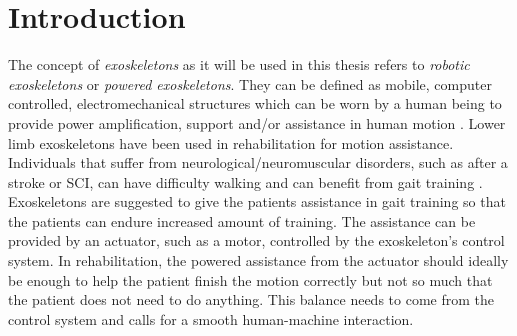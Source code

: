 \documentclass[../main.tex]{subfiles}
\begin{document}
\chapter{Introduction}
The concept of \textit{exoskeletons} as it will be used in this thesis refers to \textit{robotic exoskeletons} or \textit{powered exoskeletons}. 
They can be defined as mobile, computer controlled, electromechanical structures which can be worn by a human being to provide power amplification, support and/or assistance in human motion \cite{Anam2012, Gorgey2018}. 
Lower limb exoskeletons have been used in rehabilitation for motion assistance.
Individuals that suffer from neurological/neuromuscular disorders, such as after a stroke or \ac{SCI}, can have difficulty walking and can benefit from gait training \cite{Gorgey2018, Young2017, Lerner2017}.
Exoskeletons are suggested to give the patients assistance in gait training so that the patients can endure increased amount of training.
The assistance can be provided by an actuator, such as a motor, controlled by the exoskeleton's control system.
In rehabilitation, the powered assistance from the actuator should ideally be enough to help the patient finish the motion correctly but not so much that the patient does not need to do anything.
This balance needs to come from the control system and calls for a smooth human-machine interaction.
\end{document}
